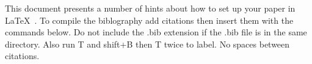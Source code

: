 \documentclass{article}
\begin{document}
 







This document presents a number of hints about how to set up your paper in \LaTeX\ .  To compile the biblography add citations then insert them with the commands below. Do not include the .bib extension if the .bib file is in the same directory. Also run T and shift+B then T twice to label. No spaces between citations. \cite{ADGXa0qBp9IJ,Dalgaard1997}

\newpage
{}

\end{document}
